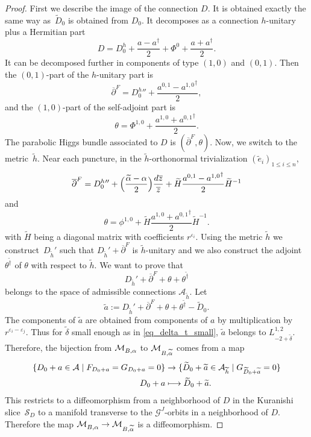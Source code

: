 \documentclass[JEP,XML,SOM,NoEqCountersInSection,Unicode,published]{cedram}
\newcommand\mto{\mathchoice{\longmapsto}{\mapsto}{\mapsto}{\mapsto}}
\newcommand{\NoChangel}[1]{%
\expandafter\let\csname old\string#1\endcsname=#1
\let#1=\relax
\newcommand{#1}{\mathcode`l="716C\csname old\string#1\endcsname\mathcode`l="7160 }%
}
\newcommand{\Dol}{\mathrm{Dol}}\NoChangel{\Dol}
\let\epsilon\varepsilon
\theoremstyle{definition}
\theoremstyle{plain}
\newcommand{\inv}{^{-1}}
\begin{document}
\begin{proof}
First we describe the image of the connection $D$. It is obtained exactly the same way as~$\widetilde{D}_0$ is obtained from $D_0$. It decomposes as a connection $h$-unitary plus a Hermitian part
\[
D= D_{0}^h+ \frac{a-a^{\dagger}}{2} + \Phi^0 +\frac{a + a^{\dagger}}{2}.
\]
It can be decomposed further in components of type $(1,0)$ and $(0,1)$. Then the $(0,1)$-part of the $h$-unitary part is
\[
\overline{\partial}^F={D_{0}^h}{}''+ \frac{a^{0,1}-{a^{1,0}}^{\dagger}}{2},
\]
and the $(1,0)$-part of the self-adjoint part is
\[
\theta = \Phi^{1,0} + \frac{a^{1,0}+{a^{0,1}}^{\dagger}}{2}.
\]
The parabolic Higgs bundle associated to $D$ is $(\overline{\partial}^F,\theta)$. Now, we switch to the metric~$\widetilde{h}$. Near each puncture, in the $\widetilde{h}$-orthonormal trivialization $(\widetilde{e}_i)_{1\le i\le n}$,
\[
\overline{\partial}^F= {D_{0}^h}{}'' +\Bigl(\frac{\widetilde{\alpha}-\alpha}{2}\Bigr)\frac{d\overline{z}}{\overline{z}} + \widetilde{H} \frac{a^{0,1}-{a^{1,0}}^{\dagger}}{2} \widetilde{H} \inv
\]
and
\[
\theta = \phi^{1,0} + \widetilde{H}\frac{a^{1,0}+{a^{0,1}}^{\dagger}}{2} \widetilde{H}\inv.
\]
with $\widetilde{H}$ being a diagonal matrix with coefficients $r^{\epsilon_i}$. Using the metric $\widetilde{h}$ we construct~$D_{\widetilde{h}}'$ such that $D_{\widetilde{h}}'+\overline{\partial}^F$ is $\widetilde{h}$-unitary and we also construct the adjoint $\theta^{\widetilde{\dagger}}$ of $\theta$ with respect to $\widetilde{h}$. We want to prove that
\[
D_{\widetilde{h}}'+\overline{\partial}^F+\theta + \theta^{\widetilde{\dagger}}
\]
belongs to the space of admissible connections $\mathcal{A}_{\widetilde{h}}$. Let
\[
\widetilde{a}:=D_{\widetilde{h}}'+\overline{\partial}^F+\theta + \theta^{\widetilde{\dagger}} - \widetilde{D}_0.
\]
The components of $\widetilde{a}$ are obtained from components of $a$ by multiplication by $r^{\epsilon_i-\epsilon_j}$. Thus for $\widetilde{\delta}$ small enough as in \eqref{eq_delta_t_small}, $\widetilde{a}$ belongs to $L^{1,2}_{-2+\widetilde{\delta}}$. Therefore, the bijection from $\mathcal{M}^{\Dol}_{B,\alpha}$ to $\mathcal{M}^{\Dol}_{B,\widetilde{\alpha}}$ comes from a map
\begin{align*}
\lbrace D_0 + a \in \mathcal{A} \mid F_{D_0+a} = G_{D_0+a}= 0\rbrace & \to\lbrace \widetilde{D}_0 + \widetilde{a} \in \mathcal{A}_{\widetilde{h}} \mid G_{\widetilde{D}_0 + \widetilde{a}}= 0\rbrace \\
D_0 + a & \mto \widetilde{D}_0 + \widetilde{a}.
\end{align*}
This restricts to a diffeomorphism from a neighborhood of $D$ in the Kuranishi slice~$\mathcal{S}_D$ to a manifold transverse to the $\mathcal{G}^J$-orbits in a neighborhood of $D$. Therefore the map $\mathcal{M}_{B,\alpha}^{\Dol}\to \mathcal{M}_{B,\widetilde{\alpha}}^{\Dol}$ is a diffeomorphism.
\end{proof}
\end{document}
